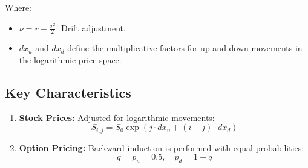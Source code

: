 \documentclass[11pt]{article}
\begin{document}
Where:
\begin{itemize}
    \item \( \nu = r - \frac{\sigma^2}{2} \): Drift adjustment.
    \item \(dx_u\) and
\(dx_d\) define the multiplicative factors for up and down movements in
the logarithmic price space.
\end{itemize}

\subsection{Key Characteristics}\label{key-characteristics}

\begin{enumerate}
\item
  \textbf{Stock Prices:} Adjusted for logarithmic movements: \[
S_{i,j} = S_0 \exp\left(j \cdot dx_u + (i-j) \cdot dx_d\right)
\]

\item
  \textbf{Option Pricing:} Backward induction is performed with equal
  probabilities: \[
q = p_u = 0.5, \quad p_d = 1 - q
\]

\end{enumerate}
\end{document}
